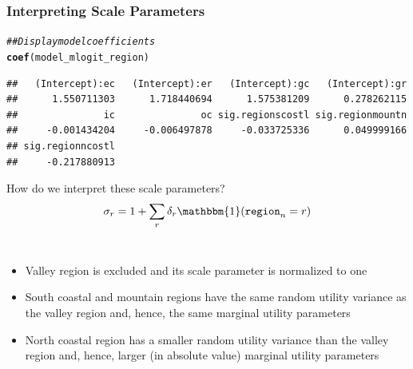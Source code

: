 \documentclass{beamer}\usepackage[]{graphicx}\usepackage[]{color}
\makeatletter
\newcommand{\hlcom}[1]{\textcolor[rgb]{0.678,0.584,0.686}{\textit{#1}}}%
\newcommand{\hlstd}[1]{\textcolor[rgb]{0.345,0.345,0.345}{#1}}%
\newcommand{\hlkwd}[1]{\textcolor[rgb]{0.737,0.353,0.396}{\textbf{#1}}}%
\newenvironment{kframe}{%
 \def\at@end@of@kframe{}%
 \ifinner\ifhmode%
  \def\at@end@of@kframe{\end{minipage}}%
  \begin{minipage}{\columnwidth}%
 \fi\fi%
 \def\FrameCommand##1{\hskip\@totalleftmargin \hskip-\fboxsep
 \colorbox{shadecolor}{##1}\hskip-\fboxsep
     \hskip-\linewidth \hskip-\@totalleftmargin \hskip\columnwidth}%
 \MakeFramed {\advance\hsize-\width
   \@totalleftmargin\z@ \linewidth\hsize
   \@setminipage}}%
 {\par\unskip\endMakeFramed%
 \at@end@of@kframe}
\newenvironment{knitrout}{}{} %
\makeatother
\begin{document}
\begin{frame}[fragile]\frametitle{Interpreting Scale Parameters}
\begin{knitrout}\footnotesize
{}\color{fgcolor}\begin{kframe}
\begin{alltt}
\hlcom{## Display model coefficients}
\hlkwd{coef}\hlstd{(model_mlogit_region)}
\end{alltt}
\begin{verbatim}
##   (Intercept):ec   (Intercept):er   (Intercept):gc   (Intercept):gr 
##      1.550711303      1.718440694      1.575381209      0.278262115 
##               ic               oc sig.regionscostl sig.regionmountn 
##     -0.001434204     -0.006497878     -0.033725336      0.049999166 
## sig.regionncostl 
##     -0.217880913
\end{verbatim}
\end{kframe}
\end{knitrout}
    \vspace{1ex}
    How do we interpret these scale parameters?
    $$\sigma_r = 1 + \sum_{r} \delta_r \mathbbm{1}(\mathtt{region}_n = r)$$ \\
    \begin{itemize}
    	\item Valley region is excluded and its scale parameter is normalized to one
        \item South coastal and mountain regions have the same random utility variance as the valley region and, hence, the same marginal utility parameters
        \item North coastal region has a smaller random utility variance than the valley region and, hence, larger (in absolute value) marginal utility parameters
    \end{itemize}
\end{frame}
\end{document}
